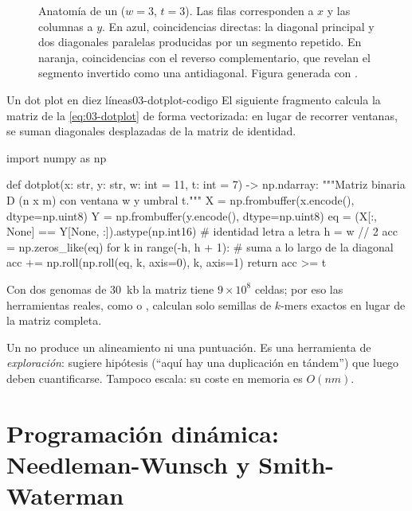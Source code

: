 \begin{figure}[t]
  \centering
  
  \caption[Anatomía de un dot plot]{Anatomía de un  ($w=3$, $t=3$). Las filas corresponden a $x$ y las columnas a $y$. En azul, coincidencias directas: la diagonal principal y dos diagonales paralelas producidas por un segmento repetido. En naranja, coincidencias con el reverso complementario, que revelan el segmento invertido como una antidiagonal. Figura generada con .}
  \label{fig:03-dotplot}
\end{figure}

\begin{ejemplo}{Un dot plot en diez líneas}{03-dotplot-codigo}
El siguiente fragmento calcula la matriz de la \cref{eq:03-dotplot} de forma vectorizada: en lugar de recorrer ventanas, se suman diagonales desplazadas de la matriz de identidad.
\begin{codigo}[dotplot.py]
import numpy as np

def dotplot(x: str, y: str, w: int = 11, t: int = 7) -> np.ndarray:
    """Matriz binaria D (n x m) con ventana w y umbral t."""
    X = np.frombuffer(x.encode(), dtype=np.uint8)
    Y = np.frombuffer(y.encode(), dtype=np.uint8)
    eq = (X[:, None] == Y[None, :]).astype(np.int16)   # identidad letra a letra
    h = w // 2
    acc = np.zeros_like(eq)
    for k in range(-h, h + 1):                          # suma a lo largo de la diagonal
        acc += np.roll(np.roll(eq, k, axis=0), k, axis=1)
    return acc >= t
\end{codigo}
Con dos genomas de \SI{30}{kb} la matriz tiene $9\times10^8$ celdas; por eso las herramientas reales, como  o , calculan solo semillas de $k$-mers exactos en lugar de la matriz completa.
\end{ejemplo}

\begin{cuidado}
Un  no produce un alineamiento ni una puntuación. Es una herramienta de \emph{exploración}: sugiere hipótesis (``aquí hay una duplicación en tándem'') que luego deben cuantificarse. Tampoco escala: su coste en memoria es $O(nm)$.
\end{cuidado}

\section{Programación dinámica: Needleman-Wunsch y Smith-Waterman}\label{sec:03-dp}

